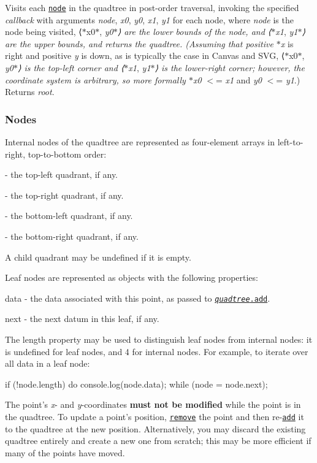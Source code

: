 Visits each \href{#nodes}{\tt node} in the quadtree in post-\/order traversal, invoking the specified {\itshape callback} with arguments {\itshape node}, {\itshape x0}, {\itshape y0}, {\itshape x1}, {\itshape y1} for each node, where {\itshape node} is the node being visited, ⟨$\ast$x0$\ast$, {\itshape y0$\ast$⟩ are the lower bounds of the node, and ⟨$\ast$x1}, {\itshape y1$\ast$⟩ are the upper bounds, and returns the quadtree. (Assuming that positive $\ast$x} is right and positive {\itshape y} is down, as is typically the case in Canvas and S\+VG, ⟨$\ast$x0$\ast$, {\itshape y0$\ast$⟩ is the top-\/left corner and ⟨$\ast$x1}, {\itshape y1$\ast$⟩ is the lower-\/right corner; however, the coordinate system is arbitrary, so more formally $\ast$x0} $<$= {\itshape x1} and {\itshape y0} $<$= {\itshape y1}.) Returns {\itshape root}.

\subsubsection*{Nodes}

Internal nodes of the quadtree are represented as four-\/element arrays in left-\/to-\/right, top-\/to-\/bottom order\+:


\begin{DoxyItemize}
\item {} -\/ the top-\/left quadrant, if any.
\item {} -\/ the top-\/right quadrant, if any.
\item {} -\/ the bottom-\/left quadrant, if any.
\item {} -\/ the bottom-\/right quadrant, if any.
\end{DoxyItemize}

A child quadrant may be undefined if it is empty.

Leaf nodes are represented as objects with the following properties\+:


\begin{DoxyItemize}
\item {\ttfamily data} -\/ the data associated with this point, as passed to \href{#quadtree_add}{\tt {\itshape quadtree}.add}.
\item {\ttfamily next} -\/ the next datum in this leaf, if any.
\end{DoxyItemize}

The {\ttfamily length} property may be used to distinguish leaf nodes from internal nodes\+: it is undefined for leaf nodes, and 4 for internal nodes. For example, to iterate over all data in a leaf node\+:


\begin{DoxyCode}
if (!node.length) do console.log(node.data); while (node = node.next);
\end{DoxyCode}


The point’s {\itshape x}-\/ and {\itshape y}-\/coordinates {\bfseries must not be modified} while the point is in the quadtree. To update a point’s position, \href{#quadtree_remove}{\tt remove} the point and then re-\/\href{#quadtree_add}{\tt add} it to the quadtree at the new position. Alternatively, you may discard the existing quadtree entirely and create a new one from scratch; this may be more efficient if many of the points have moved. 